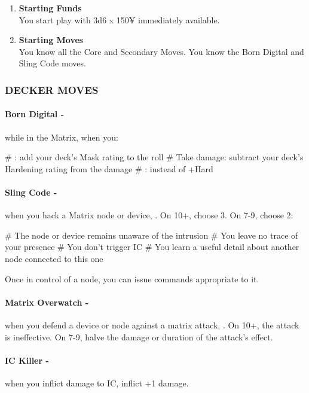 \begin{enumerate}
    \item \textbf{Starting Funds} \\
    You start play with 3d6 x 150¥ immediately available.
    
    \item \textbf{Starting Moves} \\
    You know all the Core and Secondary Moves. You know the Born Digital and Sling Code moves.
\end{enumerate}

\subsubsection{DECKER MOVES}
\paragraph{Born Digital -} while in the Matrix, when you:
    \begin{easylist}
        # : add your deck’s Mask rating to the roll
        # Take damage: subtract your deck’s Hardening rating from the damage
        # :  instead of +Hard
    \end{easylist}

\paragraph{Sling Code -} when you hack a Matrix node or device, . On 10+, choose 3. On 7-9, choose 2:
    \begin{easylist}
        # The node or device remains unaware of the intrusion
        # You leave no trace of your presence
        # You don’t trigger IC
        # You learn a useful detail about another node connected to this one
    \end{easylist}
Once in control of a node, you can issue commands appropriate to it.

\paragraph{Matrix Overwatch -} when you defend a device or node against a matrix attack, . On 10+, the attack is ineffective. On 7-9, halve the damage or duration of the attack’s effect.

\paragraph{IC Killer -} when you inflict damage to IC, inflict +1 damage.

